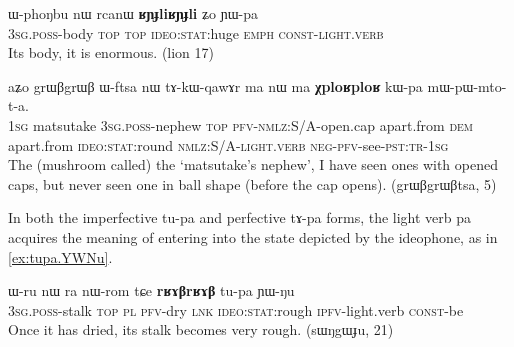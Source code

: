 \documentclass[oldfontcommands,oneside,a4paper,11pt]{article}
\newcommand{\ipa}[1]{{\phon \mbox{#1}}} %
\begin{document}
\begin{exe}
\ex \label{ex:RYJli.Zo.YWpa}
\gll 
\ipa{ɯ-phoŋbu}  	\ipa{nɯ}  	\ipa{rcanɯ}  	\ipa{\textbf{ʁɲɟliʁɲɟli}}  	\ipa{ʑo}  	\ipa{ɲɯ-pa}   \\
\textsc{3sg.poss}-body \textsc{top} \textsc{top} \textsc{ideo:stat}:huge \textsc{emph} \textsc{const}-\textsc{light.verb} \\
\glt  Its body, it is enormous. (lion 17)
\end{exe}
\begin{exe}
\ex \label{ex:XploR.kWpa}
\gll
\ipa{aʑo}  	\ipa{grɯβgrɯβ}  	\ipa{ɯ-ftsa}  	\ipa{nɯ}  	\ipa{tɤ-kɯ-qawɤr}  	\ipa{ma}  	\ipa{nɯ}  	\ipa{ma}  	\ipa{\textbf{χploʁploʁ}}  	\ipa{kɯ-pa}  	\ipa{mɯ-pɯ-mto-t-a.}  	\\
\textsc{1sg} matsutake \textsc{3sg.poss}-nephew \textsc{top} \textsc{pfv-nmlz}:S/A-open.cap apart.from \textsc{dem} apart.from \textsc{ideo:stat}:round \textsc{nmlz:S/A}-\textsc{light.verb} \textsc{neg-pfv}-see-\textsc{pst:tr-1sg} \\
\glt The (mushroom called) the `matsutake's nephew', I have seen ones with opened caps, but never seen one in ball shape (before the cap opens). (grɯβgrɯβtsa, 5)
\end{exe}

In both the imperfective \ipa{tu-pa} and perfective \ipa{tɤ-pa} forms, the light verb \ipa{pa} acquires the meaning of entering into the state depicted by the ideophone, as in \ref{ex:tupa.YWNu}.
\begin{exe}
\ex \label{ex:tupa.YWNu}
\gll
\ipa{ɯ-ru}  	\ipa{nɯ} \ipa{ra}  	\ipa{nɯ-rom}  	\ipa{tɕe}  	\ipa{\textbf{rʁɤβrʁɤβ}}  	\ipa{tu-pa}  	\ipa{ɲɯ-ŋu}  \\
\textsc{3sg.poss}-stalk \textsc{top} \textsc{pl} \textsc{pfv}-dry \textsc{lnk} \textsc{ideo:stat}:rough \textsc{ipfv}-light.verb \textsc{const}-be \\
\glt Once it has dried, its stalk becomes very rough. (sɯŋgɯɟu, 21)
\end{exe}
\end{document}
